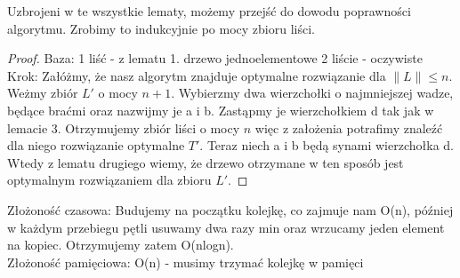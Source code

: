 \documentclass[a4paper]{scrartcl}
\begin{document}
Uzbrojeni w te wszystkie lematy, możemy przejść do dowodu poprawności algorytmu. Zrobimy to indukcyjnie po mocy zbioru liści.
\begin{proof}
Baza: 1 liść - z lematu 1. drzewo jednoelementowe
2 liście - oczywiste
Krok: Załóżmy, że nasz algorytm znajduje optymalne rozwiązanie dla $\|L\|\leq n$. Weżmy zbiór $L'$ o mocy $n+1$. Wybierzmy dwa wierzchołki o najmniejszej wadze, będące braćmi oraz nazwijmy je a i b. Zastąpmy je wierzchołkiem d tak jak w lemacie 3. Otrzymujemy zbiór liści o mocy $n$ więc z założenia potrafimy znaleźć dla niego rozwiązanie optymalne $T'$. Teraz niech a i b będą synami wierzchołka d. Wtedy z lematu drugiego wiemy, że drzewo otrzymane w ten sposób jest optymalnym rozwiązaniem dla zbioru $L'$.
\end{proof}
Złożoność czasowa: Budujemy na początku kolejkę, co zajmuje nam O(n), później w każdym przebiegu pętli usuwamy dwa razy min oraz wrzucamy jeden element na kopiec. Otrzymujemy zatem O(nlogn).\\
Złożoność pamięciowa: O(n) - musimy trzymać kolejkę w pamięci
\end{document}
